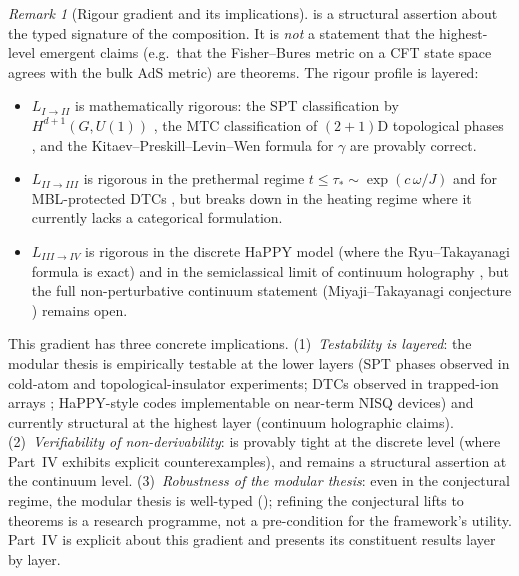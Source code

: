 \documentclass[12pt]{article}
\theoremstyle{definition}
\theoremstyle{remark}
\newtheorem{remark}[theorem]{Remark}
\begin{document}
\begin{remark}[Rigour gradient and its implications]
\label{rem:limit-rigour}
 is a structural assertion about the typed signature
of the composition. It is \emph{not} a statement that the highest-level
emergent claims (e.g.\ that the Fisher--Bures metric on a CFT state space
agrees with the bulk AdS metric) are theorems. The rigour profile is
layered:
\begin{itemize}[leftmargin=2em]
\item $L_{I \to II}$ is mathematically rigorous: the SPT classification by
  $H^{d+1}(G, U(1))$ \cite{chen2013}, the MTC classification of $(2{+}1)$D
  topological phases \cite{kitaev2003, levinwen2005}, and the
  Kitaev--Preskill--Levin--Wen formula for $\gamma$ \cite{kitaevpreskill2006}
  are provably correct.
\item $L_{II \to III}$ is rigorous in the prethermal regime $t \leq \tau_*
  \sim \exp(c\,\omega/J)$ and for MBL-protected DTCs \cite{else2016,
  bukov2015}, but breaks down in the heating regime where it currently
  lacks a categorical formulation.
\item $L_{III \to IV}$ is rigorous in the discrete HaPPY model
  \cite{pyhp2015} (where the Ryu--Takayanagi formula is exact) and in the
  semiclassical limit of continuum holography \cite{ryutakayanagi2006,
  fghmv2014}, but the full non-perturbative continuum statement
  (Miyaji--Takayanagi conjecture \cite{miyajitakayanagi2015}) remains
  open.
\end{itemize}
This gradient has three concrete implications. (1)~\emph{Testability is
layered}\/: the modular thesis is empirically testable at the lower layers
(SPT phases observed in cold-atom and topological-insulator experiments;
DTCs observed in trapped-ion arrays \cite{zhang2017}; HaPPY-style codes
implementable on near-term NISQ devices) and currently structural at the
highest layer (continuum holographic claims). (2)~\emph{Verifiability of
non-derivability}:  is provably tight at the
discrete level (where Part~IV exhibits explicit counterexamples), and
remains a structural assertion at the continuum level. (3)~\emph{Robustness
of the modular thesis}: even in the conjectural regime, the modular thesis
is well-typed (); refining the conjectural lifts to
theorems is a research programme, not a pre-condition for the framework's
utility. Part~IV is explicit about this gradient and presents its
constituent results layer by layer.
\end{remark}
\end{document}
